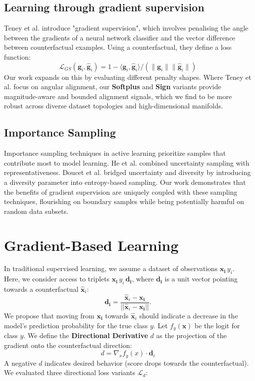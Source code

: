 \documentclass[sigconf,anonymous]{aamas}
\begin{document}
\subsection{Learning through gradient supervision}
\label{subsec:gradient_supervision}
Teney et al. \cite{teney2020learning} introduce "gradient supervision", which involves penalising the angle between the gradients of a neural network classifier and the vector difference between counterfactual examples. Using a counterfactual, they define a loss function:
\begin{equation}
        \mathcal{L}_{GS} \left(\mathbf{g}_i,\hat{\mathbf{g}}_i \right)  = 
        1 - \langle\mathbf{g}_i,\hat{\mathbf{g}}_i \rangle /
        \left( \lVert \mathbf{g}_i \rVert \lVert \hat{\mathbf{g}}_i \rVert \right)
\end{equation}
Our work expands on this by evaluating different penalty shapes. Where Teney et al. focus on angular alignment, our \textbf{Softplus} and \textbf{Sign} variants provide magnitude-aware and bounded alignment signals, which we find to be more robust across diverse dataset topologies and high-dimensional manifolds.

\subsection{Importance Sampling}
Importance sampling techniques in active learning prioritize samples that contribute most to model learning. He et al.\cite{he2014active} combined uncertainty sampling with representativeness. Doucet et al.\cite{doucet2024bridging} bridged uncertainty and diversity by introducing a diversity parameter into entropy-based sampling. Our work demonstrates that the benefits of gradient supervision are uniquely coupled with these sampling techniques, flourishing on boundary samples while being potentially harmful on random data subsets.

\section{Gradient-Based Learning}
\label{sec:gradient_learning}
In traditional supervised learning, we assume a dataset of observations {\(\mathbf{x_i}\, y_i\)}. Here, we consider access to triplets {\(\mathbf{x_i}\, y_i\, \mathbf{d_i}\)}, where $\mathbf{d_i}$ is a unit vector pointing towards a counterfactual $\hat{\mathbf{x}}_i$:
\begin{equation}
    \mathbf{d_i}=\frac{\hat{\mathbf{x}}_i - \mathbf{x_i}}{|\!|\hat{\mathbf{x}}_i - \mathbf{x_i}|\!|}. \label{eq:dir_unit}
\end{equation}
We propose that moving from $\mathbf{x_i}$ towards $\hat{\mathbf{x}}_i$ should indicate a decrease in the model's prediction probability for the true class $y$. Let $f_y(\mathbf{x})$ be the logit for class $y$. We define the \textbf{Directional Derivative} $d$ as the projection of the gradient onto the counterfactual direction:
\begin{equation}
    d = \nabla_x f_{y}(x) \cdot \mathbf{d}_{i}
\end{equation}
A negative $d$ indicates desired behavior (score drops towards the counterfactual). We evaluated three directional loss variants $\mathcal{L}_{d}$:
\end{document}
